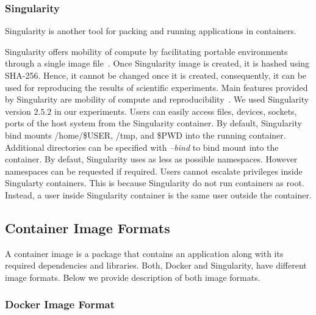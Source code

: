 \documentclass[a4paper,num-refs]{oup-contemporary}
\begin{document}
\subsubsection{Singularity}

Singularity is another tool for packing and running applications in containers. 

Singularity offers mobility of compute by facilitating portable environments 
through a single image file~\cite{kurtzer2017singularity}. Once Singularity image
is created, it is hashed using SHA-256. Hence, it cannot be changed
once it is created, consequently, it can be used for reproducing the results of
scientific experiments. Main features provided by
Singularity are mobility of compute and reproducibility~\cite{kurtzer2017singularity}.
We used Singularity version $2.5.2$ in our experiments.
Users can easily access files, devices, sockets, ports of the host system from
the Singularity container. By default, Singularity bind mounts /home/\$USER, /tmp, and \$PWD
into the running container. Additional directories can be specified with \textit{--bind}
to bind mount into the container. By defaut, Singularity uses as less as possible namespaces.
However namespaces can be requested if required. Users cannot escalate privileges inside
Singularty containers. This is because Singularity do not run containers as root.
Instead, a user inside Singularity container is the same user outside the container.

\subsection{Container Image Formats}

A container image is a package that contains an application along with its
required dependencies and libraries.
Both, Docker and Singularity, have different image formats. Below we provide description of both image
formats.

\subsubsection{Docker Image Format}
\end{document}
